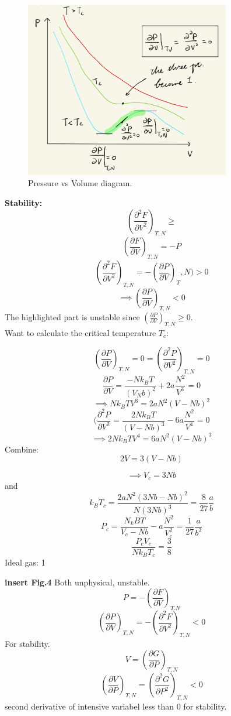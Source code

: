 \documentclass[11pt]{book}
\theoremstyle{definition}
\begin{document}
\begin{figure}[h]
	\centering
	\includegraphics[width=0.8\textwidth]{images/0702-03.png}
	\caption{Pressure vs Volume diagram.}
	\label{fig:PvsV}
\end{figure}
\textbf{Stability:} 
\[ \left (\frac{\partial ^2F}{\partial V^2} \right )_{T,N} \geq \] 
\[ \left (\frac{\partial F}{\partial V} \right )_{T,N} = -P \] 
\[ \left (\frac{\partial ^2F}{\partial V^2} \right )_{T,N} = - \left (\frac{\partial P}{\partial V} \right )_T,N) > 0 \] 
\[ \implies  \left (\frac{\partial P}{\partial V} \right )_{T,N} < 0\] 
The highlighted part is unstable since $ \left (\frac{\partial P}{\partial V} \right )_{T,N} \geq 0 $.  \\

Want to calculate the critical temperature $ T_c $:

\[ \left (\frac{\partial P}{\partial V} \right )_{T,N} = 0 = \left (\frac{\partial ^2P}{\partial V^2} \right )_{T,N} = 0 \] 
\[ \frac{\partial P}{\partial V} = \frac{-Nk_BT}{(V_Nb)^2} + 2a \frac{N^2}{V^3} = 0\] 
\[ \implies Nk_BTV^3 = 2aN^2 (V-Nb)^2 \] 
\[  (\frac{\partial ^2P}{\partial V^2}   = \frac{2Nk_BT}{(V-Nb)^3} - 6a \frac{N^2}{V^{4}} = 0\] 
\[ \implies 2Nk_BTV^4 = 6aN^2(V-Nb)^3 \] 
Combine:
\[ 2V = 3(V-Nb) \] 
\begin{shaded*}
	\[ \implies V_c = 3Nb \] 
and
\[ k_BT_c = \frac{2aN^2(3Nb-Nb)^2}{N(3Nb)^3} =  \frac{8}{27}\frac{a}{b}\] 
\[ P_c = \frac{N_kBT}{V_c-Nb} - a \frac{N^2}{V_c^2} = \frac{1}{27}\frac{a}{b^2} \] 
\[ \frac{P_cV_c}{Nk_BT_c} = \frac{3}{8} \] Ideal gas: 1
\end{shaded*}

\textbf{insert Fig.4} 
Both unphysical, unstable.
\[ P = -\left (\frac{\partial F}{\partial V} \right )_{T.N} \] 
\[ \left (\frac{\partial P}{\partial V} \right )_{T,N} = - \left (\frac{\partial ^2F}{\partial V^2} \right )_{T,N} < 0 \] 
For stability.
\[ V = \left (\frac{\partial G}{\partial P} \right )_{T,N}\] 
\[ \left (\frac{\partial V}{\partial P} \right )_{T,N} = \left (\frac{\partial ^2G}{\partial P^2} \right )_{T,N} < 0 \] second derivative of intensive variabel less than $ 0 $ for stability. 
\end{document}
